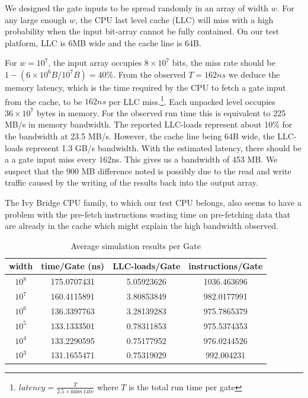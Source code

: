 \par
We designed the gate inputs to be spread randomly in an array of width $w$. For any large enough $w$, the CPU last level cache (LLC) will miss with a high probability when the input bit-array cannot be fully contained. On our test platform, LLC is 6MB wide and the cache line is 64B\cite{agner}. 
\par
For $w = 10^7$, the input array occupies $8 \times 10^7$ bits, the miss rate should be $1 - (6\times10^6B/10^7B) = 40\%$. From the observed $T = 162ns$ we deduce the memory latency, which is the time required by the CPU to fetch a gate input from the cache, to be $162ns$ per LLC miss.\footnote{ $latency = \frac{T}{2.5 \times \text{miss rate}}$ where $T$ is the total run time per gate}. Each unpacked level occupies $ 36\times10^7$ bytes in memory. For the observed run time this is equivalent to 225 MB/s in memory bandwidth. The reported LLC-loads represent about 10\% for the bandwidth at 23.5 MB/s. However, the cache line being 64B wide, the LLC-loads represent 1.3 GB/s bandwidth. With the estimated latency, there should be a a gate input miss every 162ns. This gives us a bandwidth of 453 MB. We suspect that the 900 MB difference noted is possibly due to the read and write traffic caused by the writing of the results back into the output array.
\par
The Ivy Bridge CPU family, to which our test CPU belongs, also seems to have a problem with the pre-fetch instructions wasting time on pre-fetching data that are already in the cache\cite{agner} which might explain the high bandwidth observed.
\par
\begin{table}[]
\centering
\begin{tabular}{|c|c|c|c|}
\hline
width  & time/Gate (ns) & LLC-loads/Gate & instructions/Gate \\ \hline
$10^8$ & 175.0707431    & 5.05923626     & 1036.463696       \\ \hline
$10^7$ & 160.4115891    & 3.80853849     & 982.0177991       \\ \hline
$10^6$ & 136.3397763    & 3.28139283     & 975.7865379       \\ \hline
$10^5$ & 133.1333501    & 0.78311853     & 975.5374353       \\ \hline
$10^4$ & 133.2290595    & 0.75177952     & 976.0244526       \\ \hline
$10^3$ & 131.1655471    & 0.75319029     & 992.004231        \\ \hline
\end{tabular}
\caption{Average simulation results per Gate}
\label{tab:fig3}
\end{table}
